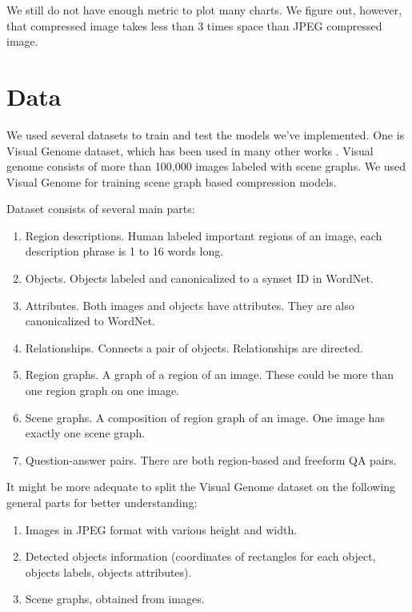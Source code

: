 We still do not have enough metric to plot many charts. We figure out, however, that compressed image takes less than 3 times space than JPEG compressed image.

\chapter{Data}
\label{section:data}

We used several datasets to train and test the models we've implemented. One is Visual Genome dataset, which has been used in many other works \cite{Krishna_Zhu_Groth_Johnson_Hata_Kravitz_Chen_Kalantidis_Li_Shamma_etal_2016}. Visual genome consists of more than 100,000 images labeled with scene graphs. We used Visual Genome for training scene graph based compression models.

Dataset consists of several main parts:

\begin{enumerate}
    \item Region descriptions. Human labeled important regions of an image, each description phrase is 1 to 16 words long.
    \item Objects. Objects labeled and canonicalized to a synset ID in WordNet.
    \item Attributes. Both images and objects have attributes. They are also canonicalized to WordNet.
    \item Relationships. Connects a pair of objects. Relationships are directed.
    \item Region graphs. A graph of a region of an image. These could be more than one region graph on one image.
    \item Scene graphs. A composition of region graph of an image. One image has exactly one scene graph.
    \item Question-answer pairs. There are both region-based and freeform QA pairs.
\end{enumerate}

It might be more adequate to split the Visual Genome dataset on the following general parts for better understanding:

\begin{enumerate}
    \item Images in JPEG format with various height and width.
    \item Detected objects information (coordinates of rectangles for each object, objects labels, objects attributes).
    \item Scene graphs, obtained from images.
\end{enumerate}

